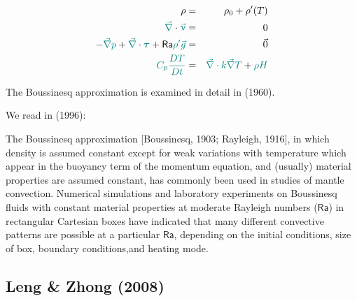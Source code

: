 \documentclass[a4paper,11pt]{article}
\newcommand{\nn}{\nonumber}
\newcommand{\Ranb}{{\mathsf{Ra}}}
\begin{document}
\begin{eqnarray}
\rho &=& \rho_0 + \rho'(T) \nn\\
{\color{teal} \vec\nabla } \cdot  {\color{teal}  \vec\upnu} &=& 0 
\nn\\
-{\color{teal} \vec\nabla} {\color{teal}p} + {\color{teal} \vec\nabla} \cdot 
{\color{teal} {\bm \tau}}
+ \Ranb  {\color{teal} \rho' \vec{g}} &=&\vec{0} 
\nn\\
{\color{teal}  C_p \frac{DT}{Dt}} 
&=&
{\color{teal} \vec\nabla \cdot k \vec\nabla T}
+
{\color{teal} \rho H }
\end{eqnarray}


The Boussinesq approximation is examined in detail in \cite{spve60} (1960).

We read in \cite{tack96} (1996):
\begin{displayquote} {\color{darkgray}
The Boussinesq approximation [Boussinesq, 1903; Rayleigh, 1916], 
in which density is assumed constant
except for weak variations with temperature which appear in
the buoyancy term of the momentum equation, and (usually)
material properties are assumed constant, has commonly been
used in studies of mantle convection. Numerical simulations
and laboratory experiments on Boussinesq fluids with constant
material properties at moderate Rayleigh numbers ($\Ranb$) in
rectangular Cartesian boxes have indicated that many
different convective patterns are possible at a particular $\Ranb$,
depending on the initial conditions, size of box, boundary
conditions,and heating mode.
}
\end{displayquote}




\newpage
\subsection{Leng \& Zhong (2008)}\label{complezh08}
\end{document}
